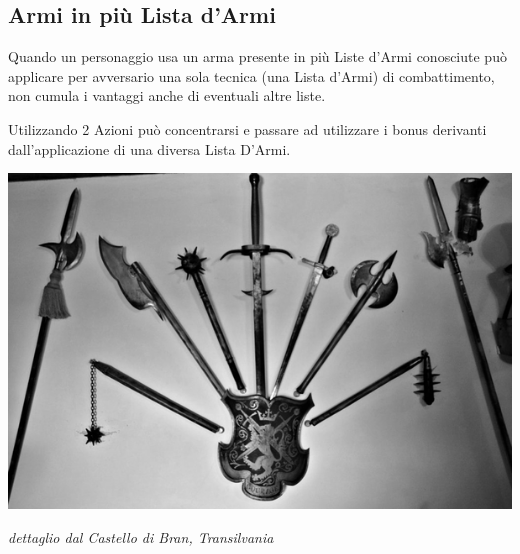 \begin{multicols}{2}
\subsection{Armi in più Lista d'Armi}\label{listaarmiinpiuliste}

Quando un personaggio usa un arma presente in più Liste d'Armi conosciute può applicare per avversario una sola tecnica (una Lista d'Armi) di combattimento, non cumula i vantaggi anche di eventuali altre liste.

Utilizzando 2 Azioni può concentrarsi e passare ad utilizzare i bonus derivanti dall'applicazione di una diversa Lista D'Armi.

\end{multicols}

\vfill

\begin{center}
\includegraphics[width=0.95\linewidth]{immagini/brancastle.png}

\emph{dettaglio dal Castello di Bran, Transilvania}
\end{center}

\pagebreak
